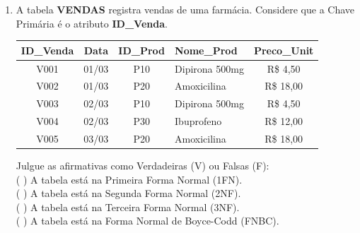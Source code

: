 \documentclass[12pt,a4paper]{article}
\begin{document}
\begin{enumerate}
    \begin{enumerate}[label=\Alph*)]
        \item Motivo: Falta de chave primária. Normalização: Definir o ID como PK.
        \item Motivo: Atributos multivalorados (campo Contatos possui email e telefone). Normalização: Criar um registro para cada contato.
        \item Motivo: Dependência parcial da chave. Normalização: Criar uma tabela para o Nome.
        \item Motivo: Dependência transitiva. Normalização: Remover o campo Nome.
        \item Motivo: Redundância de IDs. Normalização: Alterar o ID da Bia para 4.
    \end{enumerate}


    \item A tabela \textbf{VENDAS} registra vendas de uma farmácia. Considere que a Chave Primária é o atributo \textbf{ID\_Venda}.

    \begin{center}
        \small
        \begin{tabular}{|c|c|c|l|c|}
            \hline
            \cellcolor{gray!20}\textbf{ID\_Venda} & \cellcolor{gray!20}\textbf{Data} & \cellcolor{gray!20}\textbf{ID\_Prod} & \cellcolor{gray!20}\textbf{Nome\_Prod} & \cellcolor{gray!20}\textbf{Preco\_Unit} \\ \hline
            V001 & 01/03 & P10 & Dipirona 500mg & R\$ 4,50 \\ \hline
            V002 & 01/03 & P20 & Amoxicilina & R\$ 18,00 \\ \hline
            V003 & 02/03 & P10 & Dipirona 500mg & R\$ 4,50 \\ \hline
            V004 & 02/03 & P30 & Ibuprofeno & R\$ 12,00 \\ \hline
            V005 & 03/03 & P20 & Amoxicilina & R\$ 18,00 \\ \hline
        \end{tabular}
    \end{center}

    Julgue as afirmativas como Verdadeiras (V) ou Falsas (F):\\
         ( \quad ) A tabela está na Primeira Forma Normal (1FN).\\
         ( \quad ) A tabela está na Segunda Forma Normal (2NF).\\
         ( \quad ) A tabela está na Terceira Forma Normal (3NF).\\
         ( \quad ) A tabela está na Forma Normal de Boyce-Codd (FNBC).\\



\end{enumerate}
\end{document}
